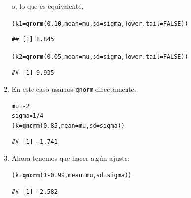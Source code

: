 \documentclass[10pt,a4paper]{article}\usepackage[]{graphicx}\usepackage[]{color}
\makeatletter
\newcommand{\hlnum}[1]{\textcolor[rgb]{0.686,0.059,0.569}{#1}}%
\newcommand{\hlopt}[1]{\textcolor[rgb]{0,0,0}{#1}}%
\newcommand{\hlstd}[1]{\textcolor[rgb]{0.345,0.345,0.345}{#1}}%
\newcommand{\hlkwb}[1]{\textcolor[rgb]{0.69,0.353,0.396}{#1}}%
\newcommand{\hlkwc}[1]{\textcolor[rgb]{0.333,0.667,0.333}{#1}}%
\newcommand{\hlkwd}[1]{\textcolor[rgb]{0.737,0.353,0.396}{\textbf{#1}}}%
\newenvironment{kframe}{%
 \def\at@end@of@kframe{}%
 \ifinner\ifhmode%
  \def\at@end@of@kframe{\end{minipage}}%
  \begin{minipage}{\columnwidth}%
 \fi\fi%
 \def\FrameCommand##1{\hskip\@totalleftmargin \hskip-\fboxsep
 \colorbox{shadecolor}{##1}\hskip-\fboxsep
     \hskip-\linewidth \hskip-\@totalleftmargin \hskip\columnwidth}%
 \MakeFramed {\advance\hsize-\width
   \@totalleftmargin\z@ \linewidth\hsize
   \@setminipage}}%
 {\par\unskip\endMakeFramed%
 \at@end@of@kframe}
\newenvironment{knitrout}{}{} %
\makeatother
\begin{document}
\begin{enumerate}
    o, lo que es equivalente,
\begin{knitrout}
\color{fgcolor}\begin{kframe}
\begin{alltt}
    \hlstd{(k1} \hlkwb{=} \hlkwd{qnorm}\hlstd{(}\hlnum{0.10}\hlstd{,} \hlkwc{mean}\hlstd{=mu,} \hlkwc{sd}\hlstd{=sigma,} \hlkwc{lower.tail}\hlstd{=}\hlnum{FALSE}\hlstd{))}
\end{alltt}
\begin{verbatim}
## [1] 8.845
\end{verbatim}
\begin{alltt}
    \hlstd{(k2} \hlkwb{=} \hlkwd{qnorm}\hlstd{(}\hlnum{0.05}\hlstd{,} \hlkwc{mean}\hlstd{=mu,} \hlkwc{sd}\hlstd{=sigma,} \hlkwc{lower.tail}\hlstd{=}\hlnum{FALSE}\hlstd{))}
\end{alltt}
\begin{verbatim}
## [1] 9.935
\end{verbatim}
\end{kframe}
\end{knitrout}

  \item En este caso usamos {\tt qnorm} directamente:
\begin{knitrout}
\color{fgcolor}\begin{kframe}
\begin{alltt}
  \hlstd{mu} \hlkwb{=} \hlopt{-}\hlnum{2}
  \hlstd{sigma} \hlkwb{=} \hlnum{1}\hlopt{/}\hlnum{4}
  \hlstd{(k} \hlkwb{=} \hlkwd{qnorm}\hlstd{(}\hlnum{0.85}\hlstd{,} \hlkwc{mean}\hlstd{=mu,} \hlkwc{sd}\hlstd{=sigma))}
\end{alltt}
\begin{verbatim}
## [1] -1.741
\end{verbatim}
\end{kframe}
\end{knitrout}


  \item  Ahora tenemos que hacer algún ajuste:
\begin{knitrout}
\color{fgcolor}\begin{kframe}
\begin{alltt}
    \hlstd{(k} \hlkwb{=} \hlkwd{qnorm}\hlstd{(}\hlnum{1} \hlopt{-} \hlnum{0.99}\hlstd{,} \hlkwc{mean}\hlstd{=mu,} \hlkwc{sd}\hlstd{=sigma))}
\end{alltt}
\begin{verbatim}
## [1] -2.582
\end{verbatim}
\end{kframe}
\end{knitrout}


\end{enumerate}
\end{document}
